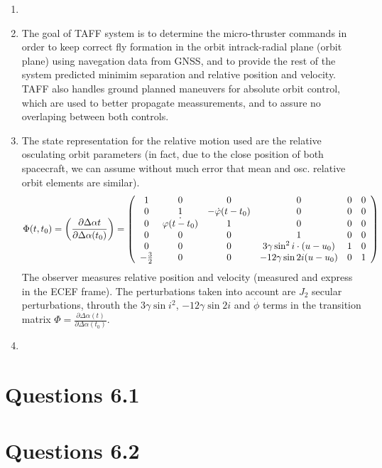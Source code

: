 \documentclass[a4paper]{article}
\begin{document}
\begin{enumerate}[label=\emph{\alph*)}]
  \item %
    
  \item %
    The goal of TAFF system is to determine the micro-thruster commands in order to keep correct fly formation in the orbit intrack-radial plane (orbit plane) using navegation data from GNSS, and to provide the rest of the system predicted minimim separation and relative position and velocity. TAFF also handles ground planned maneuvers for absolute orbit control, which are used to better propagate meassurements, and to assure no overlaping between both controls.

  \item %
    The state representation for the relative motion used are the relative osculating orbit parameters (in fact, due to the close position of both spacecraft, we can assume without much error that mean and osc. relative orbit elements are similar).
    \[\Phi(t,t_0) = \left( \frac{\partial \Delta \alpha{t}}{\partial \Delta \alpha(t_0)}\right) = 
    \left( \begin{array}{c c c c c c} 1 & 0 & 0 & 0 & 0 & 0 \\
      0 & 1 & -\dot{\varphi}(t-t_0) & 0 & 0 & 0 \\
      0 & \dot{\varphi(t-t_0)} & 1 & 0 & 0 & 0  \\
      0 & 0 & 0 & 1 & 0 & 0 \\
      0 & 0 & 0 & 3\gamma\sin^2{i}\cdot(u-u_0) & 1 & 0 \\
      -\frac{3}{2} & 0 & 0 & -12\gamma\sin{2i}(u-u_0) & 0 & 1   
  \end{array} \right)\]
    The observer measures relative position and velocity (measured and express in the ECEF frame). The perturbations taken into account are $J_2$ secular perturbations, throuth the $3\gamma\sin{i}^2$, $-12\gamma \sin{2i}$ and $\dot{\phi}$ terms in the transition matrix $\Phi=\frac{\partial \Delta \alpha (t)}{\partial \Delta \alpha (t_0)}$.

  \item %

\end{enumerate}

\section{Questions 6.1}

\section{Questions 6.2}
\end{document}

